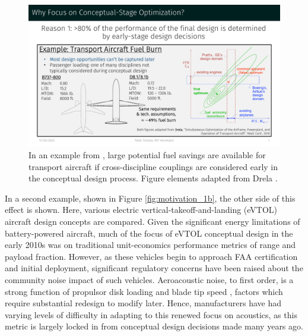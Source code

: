 \documentclass[12pt,vi,oneside]{report}
\begin{document}
    \begin{figure}[h]
        \centering
        \includegraphics[page=1,trim=1cm 1.3cm 1cm 5cm, clip, width=\textwidth]{../figures/motivation_for_conceptual_MDO_focus.pdf}
        \caption{In an example from \cite{drela_development_2011}, large potential fuel savings are available for transport aircraft if cross-discipline couplings are considered early in the conceptual design process. Figure elements adapted from Drela \cite{drela_simultaneous_2010}.}
        \label{fig:motivation_1a}
    \end{figure}

    In a second example, shown in Figure \ref{fig:motivation_1b}, the other side of this effect is shown. Here, various electric vertical-takeoff-and-landing (eVTOL) aircraft design concepts are compared. Given the significant energy limitations of battery-powered aircraft, much of the focus of eVTOL conceptual design in the early 2010s was on traditional unit-economics performance metrics of range and payload fraction. However, as these vehicles begin to approach FAA certification and initial deployment, significant regulatory concerns have been raised about the community noise impact of such vehicles. Aeroacoustic noise, to first order, is a strong function of propulsor disk loading and blade tip speed \cite{marte_review_1970}, factors which require substantial redesign to modify later. Hence, manufacturers have had varying levels of difficulty in adapting to this renewed focus on acoustics, as this metric is largely locked in from conceptual design decisions made many years ago.
\end{document}
